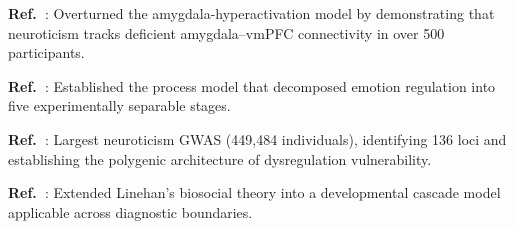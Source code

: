 \documentclass[10pt]{article}
\begin{document}
\vspace{\TSHalf}
\TSRule{\linewidth}{0.2pt}
\vspace{\TSGrid}

{\sansfont\TSStep\bfseries{}\par}
\vspace{\TSHalf}

{\TSBody\small
\noindent
\textbf{Ref.~\cite{silverman2019}}: Overturned the amygdala-hyperactivation model by demonstrating that neuroticism tracks deficient amygdala--vmPFC connectivity in over 500 participants.

\noindent
\textbf{Ref.~\cite{gross2002}}: Established the process model that decomposed emotion regulation into five experimentally separable stages.

\noindent
\textbf{Ref.~\cite{nagel2018}}: Largest neuroticism GWAS (449,484 individuals), identifying 136 loci and establishing the polygenic architecture of dysregulation vulnerability.

\noindent
\textbf{Ref.~\cite{crowell2009}}: Extended Linehan's biosocial theory into a developmental cascade model applicable across diagnostic boundaries.\par}

\small

\normalsize

\clearpage

\end{document}
